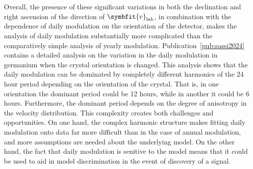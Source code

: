 \documentclass[b5paper, 10pt, twoside]{book}
\renewcommand{\vec}[1]{\symbfit{#1}}
\begin{document}
Overall, the presence of these significant variations in both the declination and right ascension of the direction of $\vec{v}_\text{lab}$, in combination with the dependence of daily modulation on the orientation of the detector, makes the analysis of daily modulation substantially more complicated than the comparatively simple analysis of yearly modulation. Publication~\ref{pub:sassi2024} contains a detailed analysis on the variation in the daily modulation in germanium when the crystal orientation is changed. This analysis shows that the daily modulation can be dominated by completely different harmonics of the 24 hour period depending on the orientation of the crystal. That is, in one orientation the dominant period could be 12 hours, while in another it could be 6 hours. Furthermore, the dominant period depends on the degree of anisotropy in the velocity distribution. This complexity creates both challenges and opportunities. On one hand, the complex harmonic structure makes fitting daily modulation onto data far more difficult than in the case of annual modulation, and more assumptions are needed about the underlying model. On the other hand, the fact that daily modulation is senitive to the model means that it could be used to aid in model discrimination in the event of discovery of a signal.
\end{document}
